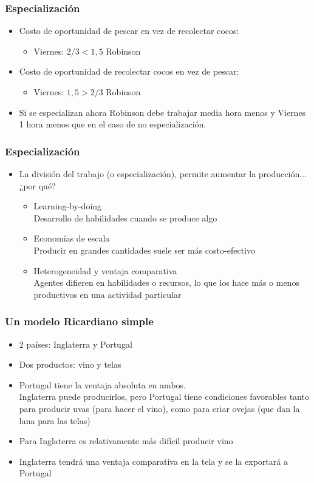 \documentclass{beamer}
\begin{document}
\begin{frame}
\frametitle{ Especialización}
\begin{itemize}
    \item Costo de oportunidad de pescar en vez de recolectar cocos:
        \begin{itemize}
        \item Viernes: $ 2/3 < 1,5 $ Robinson 
        \end{itemize}
    \item Costo de oportunidad de recolectar cocos en vez de pescar:
        \begin{itemize}
        \item Viernes: $ 1,5 > 2/3 $ Robinson 
        \end{itemize}
    \item Si se especializan ahora Robinson debe trabajar media hora menos y Viernes 1 hora menos que en el caso de no especialización. 
\end{itemize}
\end{frame}

\begin{frame}
\frametitle{ Especialización}
\begin{itemize}
    \item La división del trabajo (o especialización), permite aumentar la producción... ¿por qué?  
    \begin{itemize}
        \item Learning-by-doing \\
        Desarrollo de habilidades cuando se produce algo 
        \item Economías de escala\\
        Producir en grandes cantidades suele ser más costo-efectivo
        \item Heterogeneidad y ventaja comparativa \\
        Agentes difieren en habilidades o recursos, lo que los hace más o menos productivos en una actividad particular
    \end{itemize}
\end{itemize} 
\end{frame}

\begin{frame}
\frametitle{ Un modelo Ricardiano simple}
\begin{itemize}
    \item 2 países: Inglaterra y Portugal
    \item Dos productos: vino y telas
    \item Portugal tiene la ventaja absoluta en ambos. \\
    Inglaterra puede producirlos, pero Portugal tiene condiciones favorables tanto para producir uvas (para hacer el vino), como para criar ovejas (que dan la lana para las telas)
    \item Para Inglaterra es relativamente más difícil producir vino
    \item Inglaterra tendrá una ventaja comparativa en la tela y se la exportará a Portugal
\end{itemize} 
\end{frame}
\end{document}
